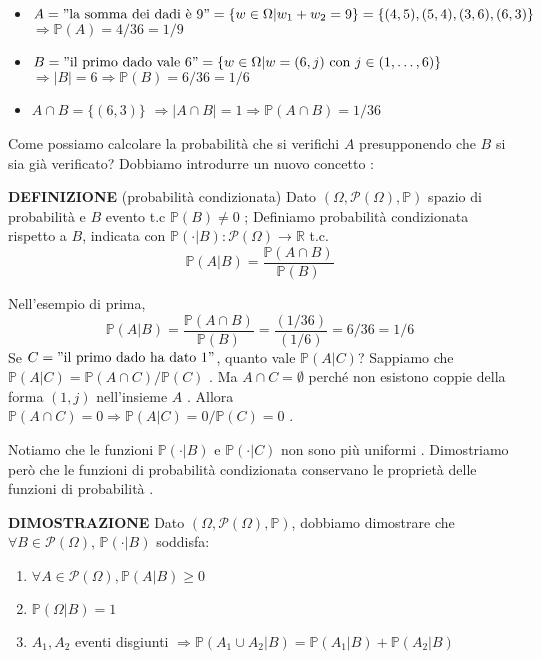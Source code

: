 \documentclass[12pt,a4paper, openany]{book}
\begin{document}
	\begin{itemize}
		\item $A = "\text{la somma dei dadi è 9}" = \{w \in \Omega | w_1 + w_2 = 9\} = \{(4, 5), (5, 4), (3, 6), (6, 3)\}$  $\Rightarrow \mathbb{P}(A) = 4/36 = 1/9$ 
		\item $B = "\text{il primo dado vale 6}" = \{w \in \Omega | w = (6, j) \text{ con } j \in (1, \dots, 6)\}$  $\Rightarrow |B| = 6 \Rightarrow \mathbb{P}(B) = 6/36 = 1/6$ 
		\item $A \cap B = \{(6, 3)\}$  $\Rightarrow |A \cap B| = 1 \Rightarrow \mathbb{P}(A \cap B) = 1/36$ 
	\end{itemize}
	Come possiamo calcolare la probabilità che si verifichi $A$ presupponendo che $B$ si sia già verificato? Dobbiamo introdurre un nuovo concetto :
	
	\textbf{DEFINIZIONE} (probabilità condizionata) 
	Dato $(\Omega, \mathcal{P}(\Omega), \mathbb{P})$ spazio di probabilità e $B$ evento t.c $\mathbb{P}(B) \neq 0$ ;
	Definiamo probabilità condizionata rispetto a $B$, indicata con $\mathbb{P}(\cdot | B) : \mathcal{P}(\Omega) \rightarrow \mathbb{R}$ t.c.
	$$ \mathbb{P}(A|B) = \frac{\mathbb{P}(A \cap B)}{\mathbb{P}(B)} $$ 
	
	Nell'esempio di prima,
	$$ \mathbb{P}(A|B) = \frac{\mathbb{P}(A \cap B)}{\mathbb{P}(B)} = \frac{(1/36)}{(1/6)} = 6/36 = 1/6 $$ 
	Se $C = "\text{il primo dado ha dato 1}"$, quanto vale $\mathbb{P}(A|C)$?  Sappiamo che $\mathbb{P}(A|C) = \mathbb{P}(A \cap C) / \mathbb{P}(C)$ . Ma $A \cap C = \emptyset$ perché non esistono coppie della forma $(1, j)$ nell'insieme $A$ . Allora $\mathbb{P}(A \cap C) = 0 \Rightarrow \mathbb{P}(A|C) = 0 / \mathbb{P}(C) = 0$ .
	
	Notiamo che le funzioni $\mathbb{P}(\cdot | B)$ e $\mathbb{P}(\cdot | C)$ non sono più uniformi . Dimostriamo però che le funzioni di probabilità condizionata conservano le proprietà delle funzioni di probabilità .
	
	\textbf{DIMOSTRAZIONE} 
	Dato $(\Omega, \mathcal{P}(\Omega), \mathbb{P})$, dobbiamo dimostrare che $\forall B \in \mathcal{P}(\Omega)$, $\mathbb{P}(\cdot | B)$ soddisfa: 
	\begin{enumerate}
		\item $\forall A \in \mathcal{P}(\Omega), \mathbb{P}(A|B) \geq 0$ 
		\item $\mathbb{P}(\Omega|B) = 1$ 
		\item $A_1, A_2$ eventi disgiunti $\Rightarrow \mathbb{P}(A_1 \cup A_2|B) = \mathbb{P}(A_1|B) + \mathbb{P}(A_2|B)$ 
	\end{enumerate}
	
\end{document}
